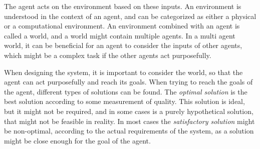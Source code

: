 The agent acts on the environment based on these inputs.
An environment is understood in the context of an agent, and can be categorized as either a physical or a computational environment.
An environment combined with an agent is called a world, and a world might contain multiple agents.
In a multi agent world, it can be beneficial for an agent to consider the inputs of other agents, which might be a complex task if the other agents act purposefully.

When designing the system, it is important to consider the world, so that the agent can act purposefully and reach its goals.
When trying to reach the goals of the agent, different types of solutions can be found.
The \textit{optimal solution} is the best solution according to some measurement of quality.
This solution is ideal, but it might not be required, and in some cases is a purely hypothetical solution, that might not be feasible in reality.
In most cases the \textit{satisfactory solution} might be non-optimal, according to the actual requirements of the system, as a solution might be close enough for the goal of the agent.
